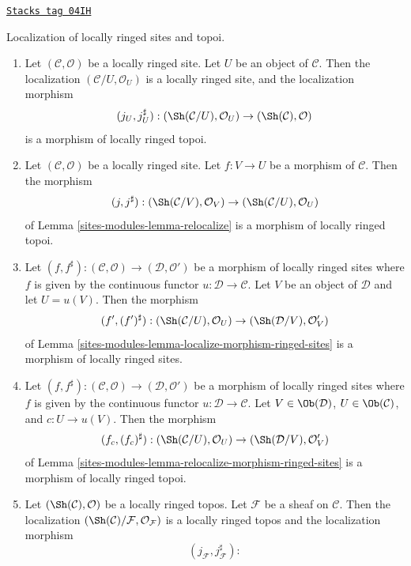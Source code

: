 \begin{lemma}
\label{sites-modules-lemma-localize-morphism-locally-ringed-topoi}
\href{https://stacks.math.columbia.edu/tag/04IH}{\texttt{Stacks tag 04IH}}

Localization of locally ringed sites and topoi.
\begin{enumerate}
\item Let $(\mathcal{C}, \mathcal{O})$ be a locally ringed site.
Let $U$ be an object of $\mathcal{C}$. Then the localization
$(\mathcal{C}/U, \mathcal{O}_U)$ is a locally ringed site, and
the localization morphism
$$
(j_U, j_U^\sharp) :
(\Sh(\mathcal{C}/U), \mathcal{O}_U)
\to
(\Sh(\mathcal{C}), \mathcal{O})
$$
is a morphism of locally ringed topoi.
\item Let $(\mathcal{C}, \mathcal{O})$ be a locally ringed site.
Let $f : V \to U$ be a morphism of $\mathcal{C}$.
Then the morphism
$$
(j, j^\sharp) :
(\Sh(\mathcal{C}/V), \mathcal{O}_V)
\to
(\Sh(\mathcal{C}/U), \mathcal{O}_U)
$$
of
Lemma \ref{sites-modules-lemma-relocalize}
is a morphism of locally ringed topoi.
\item Let
$(f, f^\sharp) :
(\mathcal{C}, \mathcal{O})
\longrightarrow
(\mathcal{D}, \mathcal{O}')$
be a morphism of locally ringed sites where $f$ is given by the continuous
functor $u : \mathcal{D} \to \mathcal{C}$. Let $V$ be an object of
$\mathcal{D}$ and let $U = u(V)$. Then the morphism
$$
(f', (f')^\sharp) :
(\Sh(\mathcal{C}/U), \mathcal{O}_U)
\to
(\Sh(\mathcal{D}/V), \mathcal{O}'_V)
$$
of
Lemma \ref{sites-modules-lemma-localize-morphism-ringed-sites}
is a morphism of locally ringed sites.
\item Let
$(f, f^\sharp) :
(\mathcal{C}, \mathcal{O})
\longrightarrow
(\mathcal{D}, \mathcal{O}')$
be a morphism of locally ringed sites where $f$ is given by the continuous
functor $u : \mathcal{D} \to \mathcal{C}$. Let $V \in \Ob(\mathcal{D})$,
$U \in \Ob(\mathcal{C})$, and $c : U \to u(V)$. Then the morphism
$$
(f_c, (f_c)^\sharp) :
(\Sh(\mathcal{C}/U), \mathcal{O}_U)
\to
(\Sh(\mathcal{D}/V), \mathcal{O}'_V)
$$
of
Lemma \ref{sites-modules-lemma-relocalize-morphism-ringed-sites}
is a morphism of locally ringed topoi.
\item Let $(\Sh(\mathcal{C}), \mathcal{O})$ be a locally
ringed topos. Let $\mathcal{F}$ be a sheaf on $\mathcal{C}$.
Then the localization
$(\Sh(\mathcal{C})/\mathcal{F}, \mathcal{O}_\mathcal{F})$
is a locally ringed topos and the localization morphism
$$
(j_\mathcal{F}, j_\mathcal{F}^\sharp) :
$$
\end{enumerate}
\end{lemma}
